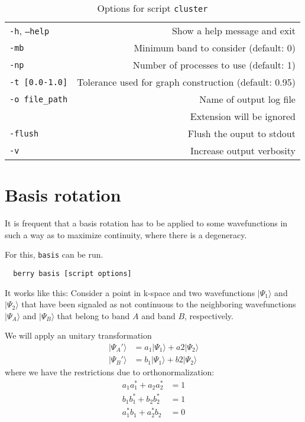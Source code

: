 \documentclass[a4paper,12pt]{report}
\begin{document}
\begin{table}[h]
  \centering
  \caption{ Options for script \texttt{cluster}}\label{tab:options_cluster}
  \begin{tabular}[]{lr}
  \hline
  \texttt{-h}, \texttt{--help}  & Show a help message and exit \\
  \texttt{-mb}                  & Minimum band to consider (default: 0) \\
  \texttt{-np}                  & Number of processes to use (default: 1) \\
  \texttt{-t [0.0-1.0]}         & Tolerance used for graph construction (default: 0.95) \\
  \texttt{-o file\_path}        & Name of output log file\\
                                & Extension will be ignored \\
  \texttt{-flush}               & Flush the ouput to stdout \\
  \texttt{-v}                   & Increase output verbosity \\
  \hline
 \end{tabular}
 \end{table}



\section{Basis rotation}
 It is frequent that a basis rotation has to be applied to some wavefunctions in such a way
 as to maximize continuity, where there is a degeneracy.

 For this, \texttt{basis} can be run.

 \begin{verbatim}
  berry basis [script options]
 \end{verbatim}

 It works like this:
 Consider a point in k-space and two wavefunctions $|\Psi_1\rangle$ and $|\Psi_2\rangle$
 that have been signaled as not continuous to the neighboring wavefunctions $|\Psi_A\rangle$ and $|\Psi_B\rangle$
 that belong to band $A$ and band $B$, respectively.

 We will apply an unitary transformation
 \begin{align*}
  |\Psi_A'\rangle &= a_1|\Psi_1\rangle + a2|\Psi_2\rangle \\
  |\Psi_B'\rangle &= b_1|\Psi_1\rangle + b2|\Psi_2\rangle
 \end{align*}
 where we have the restrictions due to orthonormalization:
 \begin{align*}
  a_1a_1^* + a_2a_2^* &= 1\\
  b_1b_1^* + b_2b_2^* &= 1\\
  a_1^*b_1 + a_2^*b_2 &= 0
 \end{align*}
\end{document}
